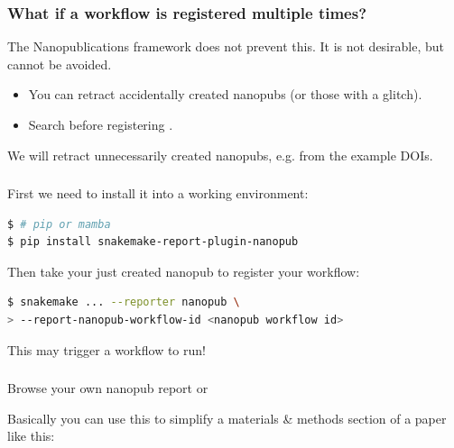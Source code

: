 \begin{frame}
    \frametitle{What if a workflow is registered multiple times?}
    \begin{docs}
        The Nanopublications framework does not prevent this. It is not desirable, but cannot be avoided.
        \begin{itemize}[<+->]
            \item You can retract accidentally created nanopubs (or those with a glitch).
            \item Search before registering . 
        \end{itemize}
    \end{docs}
    \pause
    \begin{hint}
        We will retract unnecessarily created nanopubs, e.g. from the example DOIs.
    \end{hint}
\end{frame}

\begin{frame}[fragile]
    \frametitle{}
    First we need to install it into a working \Snakemake environment:
    \begin{lstlisting}[language=Bash, style=Shell]
$ # pip or mamba
$ pip install snakemake-report-plugin-nanopub
    \end{lstlisting}
    Then take your just created nanopub to register your workflow:
    \begin{lstlisting}[language=Bash, style=Shell]
$ snakemake ... --reporter nanopub \
> --report-nanopub-workflow-id <nanopub workflow id>
    \end{lstlisting}
    \begin{warning}
        This may trigger a workflow to run!
    \end{warning}
\end{frame}

\begin{frame}[fragile]
    \frametitle{}
    Browse your own nanopub report or 
    \begin{hint}
        Basically you can use this to simplify a materials \& methods section of a paper like this:\\
        
        
    \end{hint}
\end{frame}

